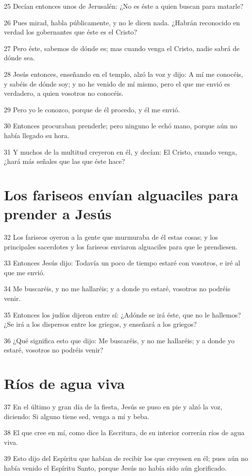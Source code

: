 \par 25 Decían entonces unos de Jerusalén: ¿No es éste a quien buscan para matarle?
\par 26 Pues mirad, habla públicamente, y no le dicen nada. ¿Habrán reconocido en verdad los gobernantes que éste es el Cristo?
\par 27 Pero éste, sabemos de dónde es; mas cuando venga el Cristo, nadie sabrá de dónde sea.
\par 28 Jesús entonces, enseñando en el templo, alzó la voz y dijo: A mí me conocéis, y sabéis de dónde soy; y no he venido de mí mismo, pero el que me envió es verdadero, a quien vosotros no conocéis.
\par 29 Pero yo le conozco, porque de él procedo, y él me envió.
\par 30 Entonces procuraban prenderle; pero ninguno le echó mano, porque aún no había llegado su hora.
\par 31 Y muchos de la multitud creyeron en él, y decían: El Cristo, cuando venga, ¿hará más señales que las que éste hace?

\section*{Los fariseos envían alguaciles para prender a Jesús}

\par 32 Los fariseos oyeron a la gente que murmuraba de él estas cosas; y los principales sacerdotes y los fariseos enviaron alguaciles para que le prendiesen.
\par 33 Entonces Jesús dijo: Todavía un poco de tiempo estaré con vosotros, e iré al que me envió.
\par 34 Me buscaréis, y no me hallaréis; y a donde yo estaré, vosotros no podréis venir.
\par 35 Entonces los judíos dijeron entre sí: ¿Adónde se irá éste, que no le hallemos? ¿Se irá a los dispersos entre los griegos, y enseñará a los griegos?
\par 36 ¿Qué significa esto que dijo: Me buscaréis, y no me hallaréis; y a donde yo estaré, vosotros no podréis venir?

\section*{Ríos de agua viva}

\par 37 En el último y gran día de la fiesta, Jesús se puso en pie y alzó la voz, diciendo: Si alguno tiene sed, venga a mí y beba.
\par 38 El que cree en mí, como dice la Escritura, de su interior correrán ríos de agua viva.
\par 39 Esto dijo del Espíritu que habían de recibir los que creyesen en él; pues aún no había venido el Espíritu Santo, porque Jesús no había sido aún glorificado.

